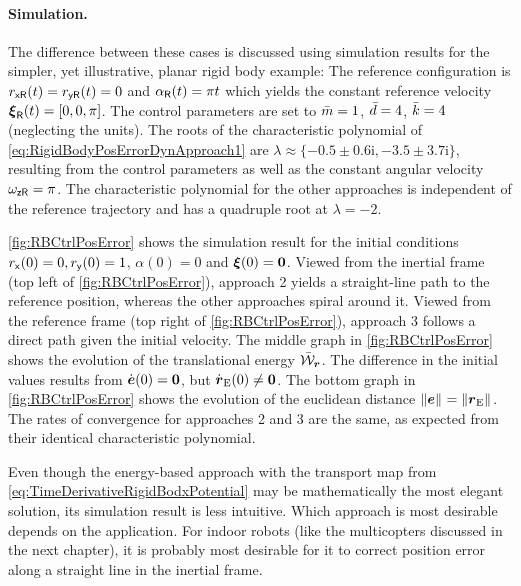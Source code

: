\paragraph{Simulation.}
The difference between these cases is discussed using simulation results for the simpler, yet illustrative, planar rigid body example:
The reference configuration is $r_{\mathsf{x}\mathsf{R}}(t) = r_{\mathsf{y}\mathsf{R}}(t) = 0$ and $\alpha_{\mathsf{R}}(t) = \pi t$ which yields the constant reference velocity $\boldsymbol{\xi}_{\mathsf{R}}(t) = [0,0,\pi]$.
The control parameters are set to $\bar{m}=1$, $\bar{d}=4$, $\bar{k}=4$ (neglecting the units).
The roots of the characteristic polynomial of \eqref{eq:RigidBodyPosErrorDynApproach1} are $\lambda \approx \{-0.5 \pm 0.6\mathrm{i}, -3.5 \pm 3.7\mathrm{i} \}$, resulting from the control parameters as well as the constant angular velocity $\omega_{\mathsf{z}\mathsf{R}}=\pi$.
The characteristic polynomial for the other approaches is independent of the reference trajectory and has a quadruple root at $\lambda = -2$.

\autoref{fig:RBCtrlPosError} shows the simulation result for the initial conditions $r_{\mathsf{x}}(0) = 0, r_{\mathsf{y}}(0) = 1$, $\alpha(0) = 0$ and $\boldsymbol{\xi}(0) = \boldsymbol{0}$.
Viewed from the inertial frame (top left of \autoref{fig:RBCtrlPosError}), approach 2 yields a straight-line path to the reference position, whereas the other approaches spiral around it.
Viewed from the reference frame (top right of \autoref{fig:RBCtrlPosError}), approach 3 follows a direct path given the initial velocity.
The middle graph in \autoref{fig:RBCtrlPosError} shows the evolution of the translational energy $\bar{\mathcal{W}}_{\boldsymbol{r}}$.
The difference in the initial values results from $\dot{\boldsymbol{e}}(0) = \boldsymbol{0}$, but $\dot{\boldsymbol{r}}_{\mathrm{E}}(0) \neq \boldsymbol{0}$.
The bottom graph in \autoref{fig:RBCtrlPosError} shows the evolution of the euclidean distance $\| \boldsymbol{e} \|_{} = \| \boldsymbol{r}_{\mathrm{E}} \|_{}$.
The rates of convergence for approaches 2 and 3 are the same, as expected from their identical characteristic polynomial.

Even though the energy-based approach with the transport map from \eqref{eq:TimeDerivativeRigidBodxPotential} may be mathematically the most elegant solution, its simulation result is less intuitive.
Which approach is most desirable depends on the application.
For indoor robots (like the multicopters discussed in the next chapter), it is probably most desirable for it to correct position error along a straight line in the inertial frame.


